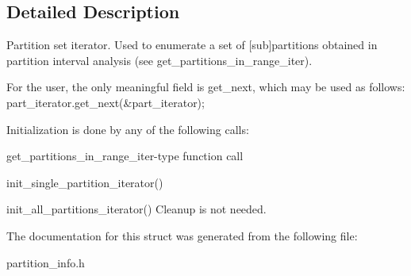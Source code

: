 \subsection{Detailed Description}
Partition set iterator. Used to enumerate a set of \mbox{[}sub\mbox{]}partitions obtained in partition interval analysis (see get\+\_\+partitions\+\_\+in\+\_\+range\+\_\+iter).

For the user, the only meaningful field is get\+\_\+next, which may be used as follows\+: part\+\_\+iterator.\+get\+\_\+next(\&part\+\_\+iterator);

Initialization is done by any of the following calls\+:
\begin{DoxyItemize}
\item get\+\_\+partitions\+\_\+in\+\_\+range\+\_\+iter-\/type function call
\item init\+\_\+single\+\_\+partition\+\_\+iterator()
\item init\+\_\+all\+\_\+partitions\+\_\+iterator() Cleanup is not needed. 
\end{DoxyItemize}

The documentation for this struct was generated from the following file\+:\begin{DoxyCompactItemize}
\item 
partition\+\_\+info.\+h\end{DoxyCompactItemize}
